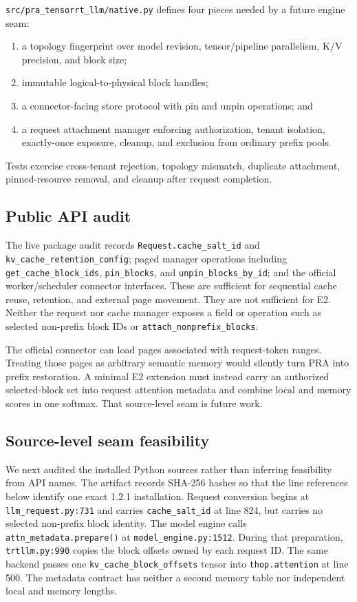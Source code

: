 \documentclass[10pt]{article}
\begin{document}
\texttt{src/pra\_tensorrt\_llm/native.py} defines four pieces needed by a
future engine seam:
\begin{enumerate}
\item a topology fingerprint over model revision, tensor/pipeline parallelism,
  K/V precision, and block size;
\item immutable logical-to-physical block handles;
\item a connector-facing store protocol with pin and unpin operations; and
\item a request attachment manager enforcing authorization, tenant isolation,
  exactly-once exposure, cleanup, and exclusion from ordinary prefix pools.
\end{enumerate}
Tests exercise cross-tenant rejection, topology mismatch, duplicate
attachment, pinned-resource removal, and cleanup after request completion.

\subsection{Public API audit}
The live package audit records \texttt{Request.cache\_salt\_id} and
\texttt{kv\_cache\_retention\_config}; paged manager operations including
\texttt{get\_cache\_block\_ids}, \texttt{pin\_blocks}, and
\texttt{unpin\_blocks\_by\_id}; and the official worker/scheduler connector
interfaces. These are sufficient for sequential cache reuse, retention, and
external page movement. They are not sufficient for E2. Neither the request
nor cache manager exposes a field or operation such as selected non-prefix
block IDs or \texttt{attach\_nonprefix\_blocks}.

The official connector can load pages associated with request-token ranges.
Treating those pages as arbitrary semantic memory would silently turn PRA into
prefix restoration. A minimal E2 extension must instead carry an authorized
selected-block set into request attention metadata and combine local and
memory scores in one softmax. That source-level seam is future work.

\subsection{Source-level seam feasibility}
We next audited the installed Python sources rather than inferring feasibility
from API names. The artifact records SHA-256 hashes so that the line references
below identify one exact 1.2.1 installation. Request conversion begins at
\texttt{llm\_request.py:731} and carries \texttt{cache\_salt\_id} at line 824,
but carries no selected non-prefix block identity. The model engine calls
\texttt{attn\_metadata.prepare()} at
\texttt{model\_engine.py:1512}. During that preparation,
\texttt{trtllm.py:990} copies the block offsets owned by each request ID. The
same backend passes one \texttt{kv\_cache\_block\_offsets} tensor into
\texttt{thop.attention} at line 500. The metadata contract has neither a second
memory table nor independent local and memory lengths.
\end{document}

